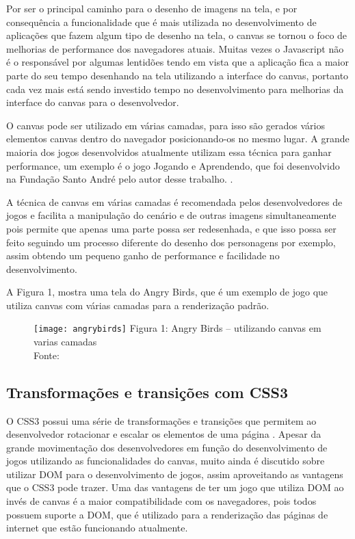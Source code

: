 Por ser o principal caminho para o desenho de imagens na tela, e por
consequência a funcionalidade que é mais utilizada no desenvolvimento
de aplicações que fazem algum tipo de desenho na tela, o canvas se tornou o foco
de melhorias de performance dos navegadores atuais. Muitas vezes
o Javascript não é o responsável por algumas lentidões
tendo em vista que a aplicação fica a maior parte do seu tempo
desenhando na tela utilizando a interface do canvas, portanto cada vez
mais está sendo investido tempo no desenvolvimento para melhorias da interface
do canvas para o desenvolvedor.

O canvas pode ser utilizado em várias camadas, para isso são gerados
vários elementos canvas dentro do navegador posicionando-os no mesmo
lugar. A grande maioria dos jogos desenvolvidos atualmente utilizam
essa técnica para ganhar performance, um exemplo é o jogo Jogando e
Aprendendo, que foi desenvolvido na Fundação Santo André pelo autor
desse trabalho. \cite{website:jogandoeaprendendo}.

A técnica de canvas em várias camadas é recomendada pelos desenvolvedores de jogos e
facilita a manipulação do cenário e de outras imagens simultaneamente pois permite que
apenas uma parte possa ser redesenhada, e que isso possa ser feito
seguindo um processo diferente do desenho dos personagens por exemplo,
assim obtendo um pequeno ganho de performance e facilidade no desenvolvimento.

A Figura 1, mostra uma tela do Angry Birds, que é um exemplo de jogo
que utiliza canvas com várias camadas para a renderização padrão.

\newlength{\imgwidth}
\setlength{\imgwidth}{16.09cm}
\newlength{\imgheight}
\setlength{\imgheight}{10.59cm}

\begin{figure}[H]
  \centering
	\texttt{[image: angrybirds]}
	\footnotesize\hspace{8\baselineskip}
	Figura 1: Angry Birds {--} utilizando canvas em varias camadas \\
	Fonte: 
  \label{img:angrybirds}
\end{figure}

\subsection{Transformações e transições com CSS3}

O CSS3 possui uma série de transformações e transições que permitem ao
desenvolvedor rotacionar e escalar os elementos de uma página
\cite{agi2011html5}. Apesar da grande movimentação dos desenvolvedores
em função do desenvolvimento de jogos utilizando as funcionalidades do
canvas, muito ainda é discutido sobre utilizar DOM para o
desenvolvimento de jogos, assim aproveitando as vantagens que o CSS3
pode trazer.
Uma das vantagens de ter um jogo que utiliza DOM ao invés de canvas é
a maior compatibilidade com os navegadores, pois todos possuem suporte
a DOM, que é utilizado para a renderização das páginas de internet que
estão funcionando atualmente.

